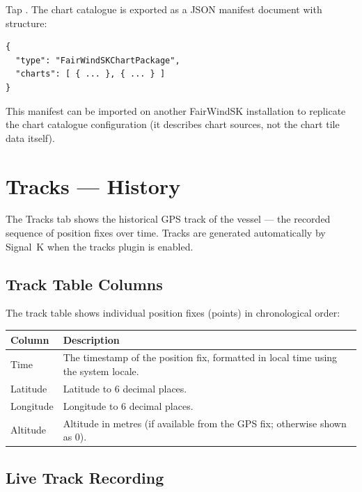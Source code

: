Tap . The chart catalogue is exported as a JSON manifest document with structure:

\begin{lstlisting}
{
  "type": "FairWindSKChartPackage",
  "charts": [ { ... }, { ... } ]
}
\end{lstlisting}

This manifest can be imported on another FairWindSK installation to replicate the chart catalogue
configuration (it describes chart sources, not the chart tile data itself).

\chapter{Tracks --- History}
\label{ch:tracks}

The Tracks tab shows the historical GPS track of the vessel --- the recorded sequence of position
fixes over time.
Tracks are generated automatically by Signal~K when the tracks plugin is enabled.


\section{Track Table Columns}

The track table shows individual position fixes (points) in chronological order:

\begin{longtable}{L{2.4cm} L{11.3cm}}
\toprule
{}
{\sffamily\bfseries\color{white} Column} &
{\sffamily\bfseries\color{white} Description} \\
\midrule
Time & The timestamp of the position fix, formatted in local time using the system locale. \\
Latitude & Latitude to 6 decimal places. \\
Longitude & Longitude to 6 decimal places. \\
Altitude & Altitude in metres (if available from the GPS fix; otherwise shown as 0). \\
\bottomrule
\end{longtable}

\section{Live Track Recording}

